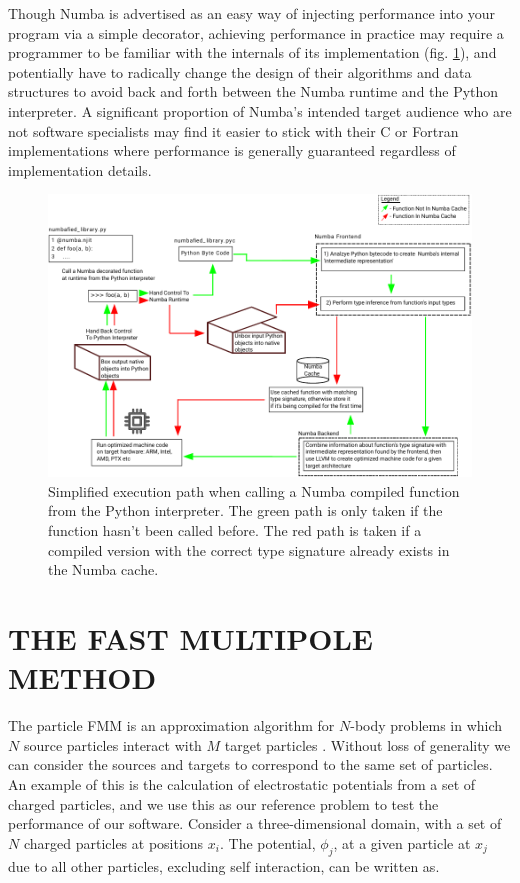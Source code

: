 \documentclass{IEEEcsmag}
\begin{document}
Though Numba is advertised as an easy way of injecting performance into your program via a simple decorator, achieving performance in practice may require a programmer to be familiar with the internals of its implementation (fig. \ref{fig:numba}), and potentially have to radically change the design of their algorithms and data structures to avoid back and forth between the Numba runtime and the Python interpreter. A significant proportion of Numba's intended target audience who are not software specialists may find it easier to stick with their C or Fortran implementations where performance is generally guaranteed regardless of implementation details.

\begin{figure}
    \centerline{\includegraphics {figures/numba.pdf}}
    \caption{Simplified execution path when calling a Numba compiled function from the Python interpreter. The green path is only taken if the function hasn't been called before. The red path is taken if a compiled version with the correct type signature already exists in the Numba cache.}
    \label{fig:numba}
\end{figure}





\section{THE FAST MULTIPOLE METHOD}

The particle FMM is an approximation algorithm for $N$-body problems in which $N$ source particles interact with $M$ target particles \cite{Greengard1987}. Without loss of generality we can consider the sources and targets to correspond to the same set of particles. An example of this is the calculation of electrostatic potentials from a set of charged particles, and we use this as our reference problem to test the performance of our software. Consider a three-dimensional domain, with a set of $N$ charged particles at positions $x_i$. The potential, $\phi_j$, at a given particle at $x_j$ due to all other particles, excluding self interaction, can be written as.
\end{document}
